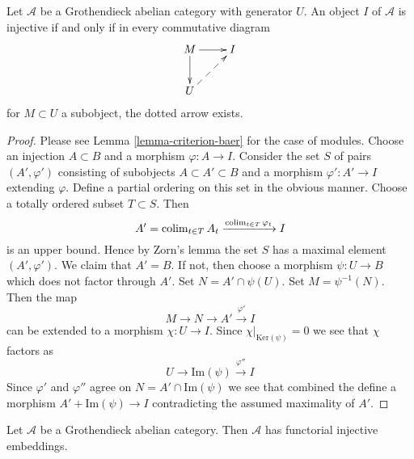 \begin{lemma}
\label{lemma-characterize-injective}
Let $\mathcal{A}$ be a Grothendieck abelian category with generator $U$.
An object $I$ of $\mathcal{A}$ is injective if and only if in every
commutative diagram
$$
\xymatrix{
M \ar[d] \ar[r] &  I \\
U \ar@{-->}[ru]
}
$$
for $M \subset U$ a subobject, the dotted arrow exists.
\end{lemma}

\begin{proof}
Please see Lemma \ref{lemma-criterion-baer} for the case of modules.
Choose an injection $A \subset B$ and a morphism $\varphi : A \to I$.
Consider the set $S$ of pairs $(A', \varphi')$ consisting of
subobjects $A \subset A' \subset B$ and a morphism $\varphi' : A' \to I$
extending $\varphi$. Define a partial ordering on this set in the obvious
manner. Choose a totally ordered subset $T \subset S$. Then
$$
A' = \mathop{\rm colim}\nolimits_{t \in T} A_t \xrightarrow{\mathop{\rm colim}\nolimits_{t \in T} \varphi_t} I
$$
is an upper bound. Hence by Zorn's lemma the set $S$ has a maximal element
$(A', \varphi')$. We claim that $A' = B$. If not, then choose a morphism
$\psi : U \to B$ which does not factor through $A'$. Set
$N = A' \cap \psi(U)$. Set $M = \psi^{-1}(N)$. Then the map
$$
M \to N \to A' \xrightarrow{\varphi'} I
$$
can be extended to a morphism $\chi : U \to I$. Since
$\chi|_{\text{Ker}(\psi)} = 0$ we see that $\chi$ factors as
$$
U \to \text{Im}(\psi) \xrightarrow{\varphi''} I
$$
Since $\varphi'$ and $\varphi''$ agree on $N = A' \cap \text{Im}(\psi)$
we see that combined the define a morphism $A' + \text{Im}(\psi) \to I$
contradicting the assumed maximality of $A'$.
\end{proof}

\begin{theorem}
\label{theorem-injective-embedding-grothendieck}
Let $\mathcal{A}$ be a Grothendieck abelian category.
Then $\mathcal{A}$ has functorial injective embeddings.
\end{theorem}

